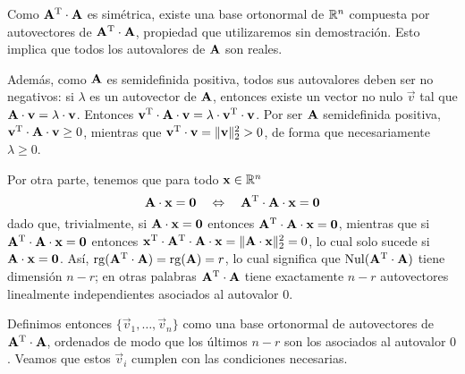 Como $\mathbf{A}^{\mathrm{T}} \cdot \mathbf{A}$ es simétrica, existe una base ortonormal de
$\mathbb{R}^n$ compuesta por autovectores de $\mathbf{A}^{\mathrm{T}} \cdot \mathbf{A}$,
propiedad que utilizaremos sin demostración. Esto implica que todos los
autovalores de $\mathbf{A}$ son reales.

Además, como $\mathbf{A}$ es semidefinida positiva, todos sus autovalores deben
ser no negativos: si $\lambda$ es un autovector de $\mathbf{A}$, entonces existe
un vector no nulo $\vec{v}$ tal que $\mathbf{A} \cdot \mathbf{v} = \lambda \cdot
\mathbf{v}$. Entonces $\mathbf{v}^{\mathrm{T}} \cdot \mathbf{A} \cdot \mathbf{v} = \lambda \cdot
\mathbf{v}^{\mathrm{T}} \cdot \mathbf{v}$. Por ser $\mathbf{A}$ semidefinida positiva,
$\mathbf{v}^{\mathrm{T}} \cdot \mathbf{A} \cdot \mathbf{v} \geq 0$, mientras que
$\mathbf{v}^{\mathrm{T}} \cdot \mathbf{v} = \lVert \mathbf{v} \rVert_2^2 > 0$, de forma que
necesariamente $\lambda \geq 0$.

Por otra parte, tenemos que para todo $\mathbf{x} \in \mathbb{R}^n$
\[ \mathbf{A} \cdot \mathbf{x} = \mathbf{0} \quad \Leftrightarrow \quad
    \mathbf{A}^{\mathrm{T}} \cdot \mathbf{A} \cdot \mathbf{x} = \mathbf{0} \]
dado que, trivialmente, si $\mathbf{A} \cdot \mathbf{x} = \mathbf{0}$ entonces
$\mathbf{A}^{\mathrm{T}} \cdot \mathbf{A} \cdot \mathbf{x} = \mathbf{0}$, mientras que si
$\mathbf{A}^{\mathrm{T}} \cdot \mathbf{A} \cdot \mathbf{x} = \mathbf{0}$ entonces
$\mathbf{x}^{\mathrm{T}} \cdot \mathbf{A}^{\mathrm{T}} \cdot \mathbf{A} \cdot \mathbf{x}
    = \lVert \mathbf{A} \cdot \mathbf{x} \rVert_2^2 = 0$, lo cual solo sucede si
$\mathbf{A} \cdot \mathbf{x} = \mathbf{0}$.
Así, $\operatorname{rg}(\mathbf{A}^{\mathrm{T}} \cdot \mathbf{A}) = \operatorname{rg}(\mathbf{A}) = r$, lo cual significa
que $\operatorname{Nul}(\mathbf{A}^{\mathrm{T}} \cdot \mathbf{A})$ tiene dimensión $n-r$; en otras
palabras $\mathbf{A}^{\mathrm{T}} \cdot \mathbf{A}$ tiene exactamente $n - r$ autovectores
linealmente independientes asociados al autovalor $0$.

Definimos entonces $\lbrace \vec{v}_1, \dots, \vec{v}_n \rbrace$ como una base
ortonormal de autovectores de $\mathbf{A}^{\mathrm{T}} \cdot \mathbf{A}$, ordenados de modo
que los últimos $n-r$ son los asociados al autovalor $0$.
Veamos que estos $\vec{v}_i$ cumplen con las condiciones necesarias.

